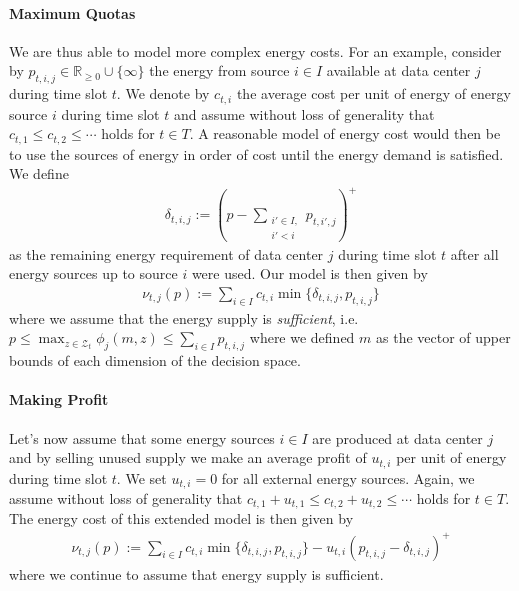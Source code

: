 \paragraph{Maximum Quotas} We are thus able to model more complex energy costs. For an example, consider by $p_{t,i,j} \in \mathbb{R}_{\geq 0} \cup \{\infty\}$ the energy from source $i \in I$ available at data center $j$ during time slot $t$. We denote by $c_{t,i}$ the average cost per unit of energy of energy source $i$ during time slot $t$ and assume without loss of generality that $c_{t,1} \leq c_{t,2} \leq \cdots$ holds for $t \in T$. A reasonable model of energy cost would then be to use the sources of energy in order of cost until the energy demand is satisfied. We define \begin{align*}
    \delta_{t,i,j} := (p - \sum_{\substack{i' \in I, \\ i' < i}} p_{t,i',j})^+
\end{align*} as the remaining energy requirement of data center $j$ during time slot $t$ after all energy sources up to source $i$ were used. Our model is then given by \begin{align*}
    \nu_{t,j}(p) := \sum_{i \in I} c_{t,i} \min\{\delta_{t,i,j}, p_{t,i,j}\}
\end{align*} where we assume that the energy supply is \emph{sufficient}, i.e. $p \leq \max_{z \in \mathcal{Z}_t} \phi_j(m,z) \leq \sum_{i \in I} p_{t,i,j}$ where we defined $m$ as the vector of upper bounds of each dimension of the decision space.

\paragraph{Making Profit} Let's now assume that some energy sources $i \in I$ are produced at data center $j$ and by selling unused supply we make an average profit of $u_{t,i}$ per unit of energy during time slot $t$. We set $u_{t,i} = 0$ for all external energy sources. Again, we assume without loss of generality that $c_{t,1} + u_{t,1} \leq c_{t,2} + u_{t,2} \leq \cdots$ holds for $t \in T$. The energy cost of this extended model is then given by \begin{align*}
    \nu_{t,j}(p) := \sum_{i \in I} c_{t,i} \min\{\delta_{t,i,j}, p_{t,i,j}\} - u_{t,i} (p_{t,i,j} - \delta_{t,i,j})^+
\end{align*} where we continue to assume that energy supply is sufficient.

